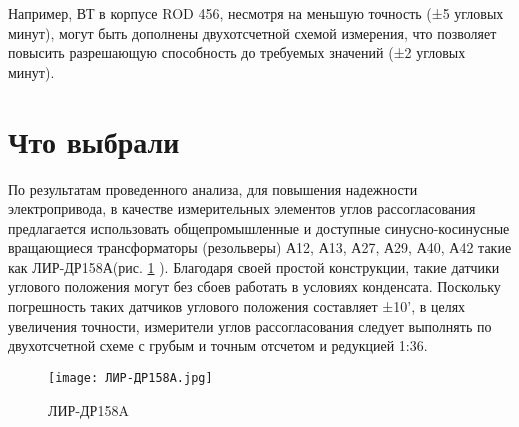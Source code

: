 Например, ВТ в корпусе ROD 456, несмотря на меньшую точность (±5 угловых минут), могут быть дополнены двухотсчетной схемой измерения, 
что позволяет повысить разрешающую способность до требуемых значений (±2 угловых минут).

\section{Что выбрали}

По результатам проведенного анализа, для повышения надежности электропривода, в качестве измерительных элементов углов рассогласования предлагается использовать общепромышленные и доступные 
синусно-косинусные вращающиеся трансформаторы (резольверы) А12, А13, А27, А29, А40, А42 такие как ЛИР-ДР158А(рис. \ref{LIR} ). Благодаря своей простой конструкции, 
такие датчики углового положения могут без сбоев работать в условиях конденсата. Поскольку погрешность таких датчиков углового положения составляет ±10', 
в целях увеличения точности, измерители углов рассогласования следует выполнять по двухотсчетной схеме с грубым и точным отсчетом и редукцией 1:36. 

  \begin{figure}[!t]
    \centering
    \texttt{[image: ЛИР-ДР158A.jpg]}
    \caption{ЛИР-ДР158A}
    \label{LIR}
  \end{figure}

  